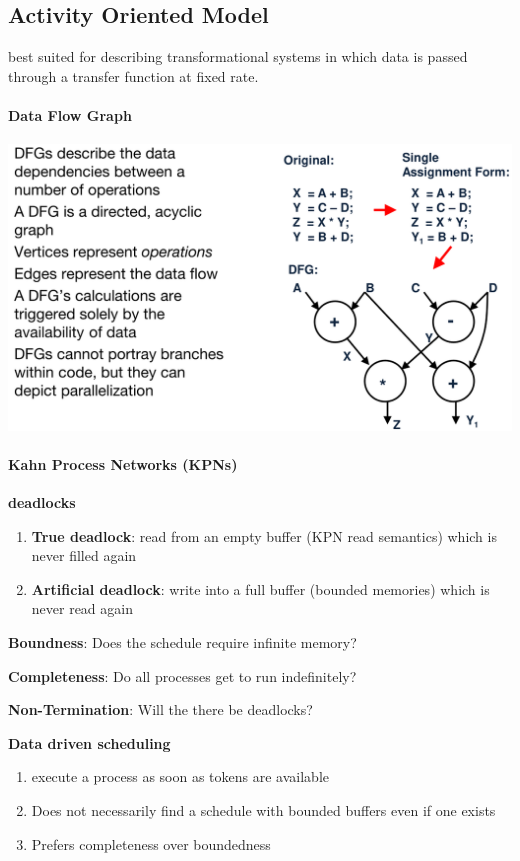 \documentclass[english]{latex4ei/latex4ei_sheet}
\begin{document}
\subsection{Activity Oriented Model}
best suited for describing transformational systems in which data is passed through a transfer function at fixed rate.

\paragraph{Data Flow Graph}
 
\begin{center}
  \includegraphics[width=0.8\linewidth]{assets/DataFlowGraph.png}
  \label{fig:dataflowgraph}
\end{center}

\paragraph{Kahn Process Networks (KPNs)}

\textbf{deadlocks}
\begin{enumerate}
  \item \textbf{True deadlock}: read from an empty buffer (KPN read semantics) which is never filled again
\item \textbf{Artificial deadlock}: write into a full buffer (bounded memories) which is never read again
\end{enumerate}

\textbf{Boundness}: Does the schedule require infinite memory?

\textbf{Completeness}: Do all processes get to run indefinitely?

\textbf{Non-Termination}: Will the there be deadlocks?

\textbf{Data driven scheduling}
\begin{enumerate}
	\item execute a process as soon as tokens are available
	\item Does not necessarily find a schedule with bounded buffers even if one exists
	\item Prefers completeness over boundedness
\end{enumerate}
\end{document}
